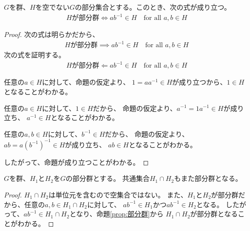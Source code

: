 {	\begin{proposition}[部分群]\label{prop:部分群} %
		$G$を群、$H$を空でない$G$の部分集合とする。このとき、次の式が成り立つ。
		\begin{equation*}\begin{split}
			\text{$H$が部分群}
			\iff ab^{-1}\in H \quad\text{for all } a,b\in H
		\end{split}\end{equation*}
	\end{proposition} %
	\begin{proof} %
		次の式は明らかだから、
		\begin{equation*}\begin{split}
			\text{$H$が部分群}
			\implies ab^{-1}\in H \quad\text{for all } a,b\in H
		\end{split}\end{equation*}
		次の式を証明する。
		\begin{equation*}\begin{split}
			\text{$H$が部分群}
			\Leftarrow ab^{-1}\in H \quad\text{for all } a,b\in H
		\end{split}\end{equation*}
		\begin{description}\setlength{\itemsep}{-1mm} %
			\item[単位元] 任意の$a\in H$に対して、命題の仮定より、
			$1=aa^{-1}\in H$が成り立つから、$1\in H$となることがわかる。
			\item[逆元] 任意の$a\in H$に対して、$1\in H$だから、
			命題の仮定より、$a^{-1}=1a^{-1}\in H$が成り立ち、
			$a^{-1}\in H$となることがわかる。
			\item[積] 任意の$a,b\in H$に対して、$b^{-1}\in H$だから、
			命題の仮定より、$ab=a(b^{-1})^{-1}\in H$が成り立ち、
			$ab\in H$となることがわかる。
		\end{description} %
		したがって、命題が成り立つことがわかる。
	\end{proof} %

	\begin{proposition}[部分群の共通集合]\label{prop:部分群の共通集合} %
		$G$を群、$H_1$と$H_2$を$G$の部分群とする。
		共通集合$H_1\cap H_2$もまた部分群となる。
	\end{proposition} %
	\begin{proof} %
		$H_1\cap H_2$は単位元を含むので空集合ではない。
		また、$H_1$と$H_2$が部分群だから、任意の$a,b\in H_1\cap H_2$に対して、
		$ab^{-1}\in H_1$かつ$ab^{-1}\in H_2$となる。
		したがって、$ab^{-1}\in H_1\cap H_2$となり、命題\ref{prop:部分群}から
		$H_1\cap H_2$が部分群となることがわかる。
	\end{proof} %

}
